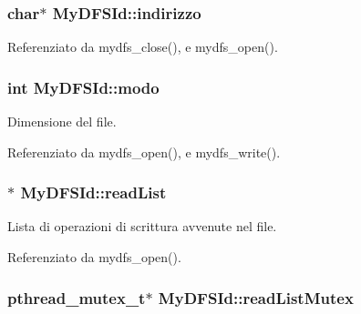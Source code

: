 \subsubsection[{\texorpdfstring{indirizzo}{indirizzo}}]{\setlength{\rightskip}{0pt plus 5cm}char$\ast$ My\+D\+F\+S\+Id\+::indirizzo}\hypertarget{structMyDFSId_ac8c10a1a5b18776bf5e5585ee9e26331}{}\label{structMyDFSId_ac8c10a1a5b18776bf5e5585ee9e26331}


Referenziato da mydfs\+\_\+close(), e mydfs\+\_\+open().

\subsubsection[{\texorpdfstring{modo}{modo}}]{\setlength{\rightskip}{0pt plus 5cm}int My\+D\+F\+S\+Id\+::modo}\hypertarget{structMyDFSId_a98bc5ce1a7734459d8b81c997da4e9f0}{}\label{structMyDFSId_a98bc5ce1a7734459d8b81c997da4e9f0}


Dimensione del file. 



Referenziato da mydfs\+\_\+open(), e mydfs\+\_\+write().

\subsubsection[{\texorpdfstring{read\+List}{readList}}]{$\ast$ My\+D\+F\+S\+Id\+::read\+List}\hypertarget{structMyDFSId_a8a4360512d45c22b6d8e980967c7dd32}{}\label{structMyDFSId_a8a4360512d45c22b6d8e980967c7dd32}


Lista di operazioni di scrittura avvenute nel file. 



Referenziato da mydfs\+\_\+open().

\subsubsection[{\texorpdfstring{read\+List\+Mutex}{readListMutex}}]{\setlength{\rightskip}{0pt plus 5cm}pthread\+\_\+mutex\+\_\+t$\ast$ My\+D\+F\+S\+Id\+::read\+List\+Mutex}\hypertarget{structMyDFSId_a71f51c82d7133bfc16fcffeb4c395da0}{}\label{structMyDFSId_a71f51c82d7133bfc16fcffeb4c395da0}


